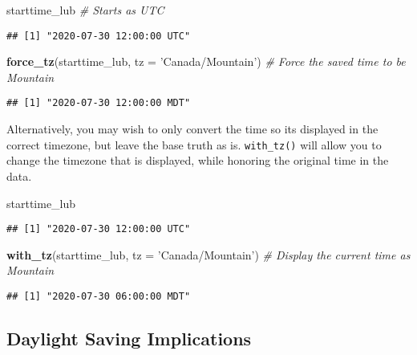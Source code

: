 \documentclass[
]{book}
\newenvironment{Shaded}{\begin{snugshade}}{\end{snugshade}}
\newcommand{\CommentTok}[1]{\textcolor[rgb]{0.56,0.35,0.01}{\textit{#1}}}
\newcommand{\DataTypeTok}[1]{\textcolor[rgb]{0.13,0.29,0.53}{#1}}
\newcommand{\KeywordTok}[1]{\textcolor[rgb]{0.13,0.29,0.53}{\textbf{#1}}}
\newcommand{\NormalTok}[1]{#1}
\newcommand{\StringTok}[1]{\textcolor[rgb]{0.31,0.60,0.02}{#1}}
\begin{document}
\begin{Shaded}
\begin{Highlighting}[]
\NormalTok{starttime_lub }\CommentTok{# Starts as UTC}
\end{Highlighting}
\end{Shaded}

\begin{verbatim}
## [1] "2020-07-30 12:00:00 UTC"
\end{verbatim}

\begin{Shaded}
\begin{Highlighting}[]
\KeywordTok{force_tz}\NormalTok{(starttime_lub, }\DataTypeTok{tz =} \StringTok{'Canada/Mountain'}\NormalTok{) }\CommentTok{# Force the saved time to be Mountain}
\end{Highlighting}
\end{Shaded}

\begin{verbatim}
## [1] "2020-07-30 12:00:00 MDT"
\end{verbatim}

Alternatively, you may wish to only convert the time so its displayed in the correct timezone, but leave the base truth as is. \texttt{with\_tz()} will allow you to change the timezone that is displayed, while honoring the original time in the data.

\begin{Shaded}
\begin{Highlighting}[]
\NormalTok{starttime_lub}
\end{Highlighting}
\end{Shaded}

\begin{verbatim}
## [1] "2020-07-30 12:00:00 UTC"
\end{verbatim}

\begin{Shaded}
\begin{Highlighting}[]
\KeywordTok{with_tz}\NormalTok{(starttime_lub, }\DataTypeTok{tz =} \StringTok{'Canada/Mountain'}\NormalTok{) }\CommentTok{# Display the current time as Mountain}
\end{Highlighting}
\end{Shaded}

\begin{verbatim}
## [1] "2020-07-30 06:00:00 MDT"
\end{verbatim}

\hypertarget{daylight-saving-implications}{%
\subsection{Daylight Saving Implications}\label{daylight-saving-implications}}
\end{document}
